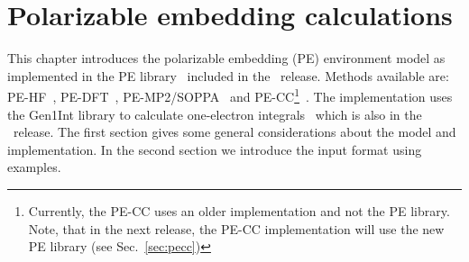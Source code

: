 \chapter{Polarizable embedding calculations}\label{ch:embedding}

This chapter introduces the polarizable embedding (PE) environment
model as implemented in the PE library~\cite{pelib2012} included in the 
\latestrelease\ release. Methods available are: PE-HF~\cite{pescf}, 
PE-DFT~\cite{pescf}, PE-MP2/SOPPA~\cite{pesoppa} and 
PE-CC\footnote{Currently, the PE-CC uses an older implementation 
and not the PE 
library. Note, that in the next release, the PE-CC
implementation will use the new PE library (see Sec.~\ref{sec:pecc})}~\cite{pecc}. 
The implementation uses the Gen1Int library to calculate one-electron
integrals~\cite{gen1int} which is also in the \latestrelease\ release. The
first section gives some general considerations about the model and 
implementation. In the second section we introduce the input format using
examples.

\begin{center}
\end{center}

